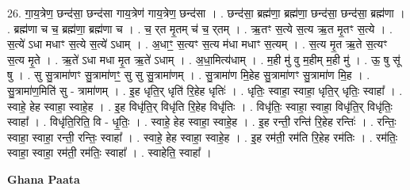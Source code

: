 \documentclass[17pt]{extarticle}
\begin{document}
26. गा॒य॒त्रेण॒ छन्द॑सा॒ छन्द॑सा गाय॒त्रेण॑ गाय॒त्रेण॒ छन्द॑सा । . छन्द॑सा॒ ब्रह्म॑णा॒ ब्रह्म॑णा॒ छन्द॑सा॒ छन्द॑सा॒ ब्रह्म॑णा । . ब्रह्म॑णा च च॒ ब्रह्म॑णा॒ ब्रह्म॑णा च । . च॒ र्‌त मृ॒तम् च॑ च॒ र्‌तम् । . ऋ॒तꣳ स॒त्ये स॒त्य ऋ॒त मृ॒तꣳ स॒त्ये । . स॒त्ये॑ ऽधा मधाꣳ स॒त्ये स॒त्ये॑ ऽधाम् । . अ॒धाꣳ॒॒ स॒त्यꣳ स॒त्य म॑धा मधाꣳ स॒त्यम् । . स॒त्य मृ॒त ऋ॒ते स॒त्यꣳ स॒त्य मृ॒ते । . ऋ॒ते॑ ऽधा मधा मृ॒त ऋ॒ते॑ ऽधाम् । . अ॒धा॒मित्य॑धाम् । . म॒ही मु॑ वु म॒हीम् म॒ही मु॑ । . ऊ॒ षु सू॑ षु । . सु सु॒त्रामा॑णꣳ सु॒त्रामा॑णꣳ॒॒ सु सु सु॒त्रामा॑णम् । . सु॒त्रामा॑ण मि॒हेह सु॒त्रामा॑णꣳ सु॒त्रामा॑ण मि॒ह । . सु॒त्रामा॑ण॒मिति॑ सु - त्रामा॑णम् । . इ॒ह धृति॒र् धृति॑ रि॒हेह धृतिः॑ । . धृतिः॒ स्वाहा॒ स्वाहा॒ धृति॒र् धृतिः॒ स्वाहा᳚ । . स्वाहे॒ हेह स्वाहा॒ स्वाहे॒ह । . इ॒ह विधृ॑ति॒र् विधृ॑ति रि॒हेह विधृ॑तिः । . विधृ॑तिः॒ स्वाहा॒ स्वाहा॒ विधृ॑ति॒र् विधृ॑तिः॒ स्वाहा᳚ । . विधृ॑ति॒रिति॒ वि - धृ॒तिः॒ । . स्वाहे॒ हेह स्वाहा॒ स्वाहे॒ह । . इ॒ह रन्ती॒ रन्ति॑ रि॒हेह रन्तिः॑ । . रन्तिः॒ स्वाहा॒ स्वाहा॒ रन्ती॒ रन्तिः॒ स्वाहा᳚ । . स्वाहे॒ हेह स्वाहा॒ स्वाहे॒ह । . इ॒ह रम॑ती॒ रम॑ति रि॒हेह रम॑तिः । . रम॑तिः॒ स्वाहा॒ स्वाहा॒ रम॑ती॒ रम॑तिः॒ स्वाहा᳚ । . स्वाहेति॒ स्वाहा᳚ । \newline

\textbf{Ghana Paata } \newline
\end{document}
